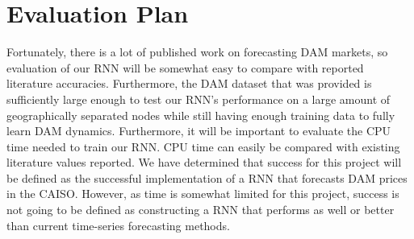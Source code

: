\documentclass[sigconf]{acmart}
\begin{document}

\section{Evaluation Plan}

%

Fortunately, there is a lot of published work on forecasting DAM markets, so evaluation of our RNN will be somewhat easy to compare with reported literature accuracies. Furthermore, the DAM dataset that was provided is sufficiently large enough to test our RNN's performance on a large amount of geographically separated nodes while still having enough training data to fully learn DAM dynamics. Furthermore, it will be important to evaluate the CPU time needed to train our RNN. CPU time can easily be compared with existing literature values reported. We have determined that success for this project will be defined as the successful implementation of a RNN that forecasts DAM prices in the CAISO. However, as time is somewhat limited for this project, success is not going to be defined as constructing a RNN that performs as well or better than current time-series forecasting methods.  

\end{document}
